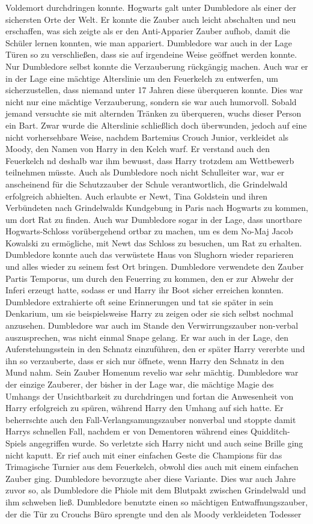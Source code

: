 \documentclass[a4paper, 10pt]{article}
\begin{document}
Voldemort durchdringen konnte. Hogwarts galt unter Dumbledore als einer der sichersten Orte der Welt. Er konnte die Zauber auch leicht abschalten und neu erschaffen, was sich zeigte als er den Anti-Apparier Zauber aufhob, damit die Schüler lernen konnten, wie man appariert. Dumbledore war auch in der Lage Türen so zu verschließen, dass sie auf irgendeine Weise geöffnet werden konnte. Nur Dumbledore selbst konnte die Verzauberung rückgängig machen. Auch war er in der Lage eine mächtige Alterslinie um den Feuerkelch zu entwerfen, um sicherzustellen, dass niemand unter 17 Jahren diese überqueren konnte. Dies war nicht nur eine mächtige Verzauberung, sondern sie war auch humorvoll. Sobald jemand versuchte sie mit alternden Tränken zu überqueren, wuchs dieser Person ein Bart. Zwar wurde die Alterslinie schließlich doch überwunden, jedoch auf eine nicht vorhersehbare Weise, nachdem Bartemius Crouch Junior, verkleidet als Moody, den Namen von Harry in den Kelch warf. Er verstand auch den Feuerkelch nd deshalb war ihm bewusst, dass Harry trotzdem am Wettbewerb teilnehmen müsste. Auch als Dumbledore noch nicht Schulleiter war, war er anscheinend für die Schutzzauber der Schule verantwortlich, die Grindelwald erfolgreich abhielten. Auch erlaubte er Newt, Tina Goldstein und ihren Verbündeten nach Grindelwalds Kundgebung in Paris nach Hogwarts zu kommen, um dort Rat zu finden. Auch war Dumbledore sogar in der Lage, dass unortbare Hogwarts-Schloss vorübergehend ortbar zu machen, um es dem No-Maj Jacob Kowalski zu ermögliche, mit Newt das Schloss zu besuchen, um Rat zu erhalten. Dumbledore konnte auch das verwüstete Haus von Slughorn wieder reparieren und alles wieder zu seinem fest Ort bringen. Dumbledore verwendete den Zauber Partis Temporus, um durch den Feuerring zu kommen, den er zur Abwehr der Inferi erzeugt hatte, sodass er und Harry ihr Boot sicher erreichen konnten. Dumbledore extrahierte oft seine Erinnerungen und tat sie später in sein Denkarium, um sie beispielsweise Harry zu zeigen oder sie sich selbst nochmal anzusehen. Dumbledore war auch im Stande den Verwirrungszauber non-verbal auszusprechen, was nicht einmal Snape gelang. Er war auch in der Lage, den Auferstehungsstein in den Schnatz einzuführen, den er später Harry vererbte und ihn so verzauberte, dass er sich nur öffnete, wenn Harry den Schnatz in den Mund nahm. Sein Zauber Homenum revelio war sehr mächtig. Dumbledore war der einzige Zauberer, der bisher in der Lage war, die mächtige Magie des Umhangs der Unsichtbarkeit zu durchdringen und fortan die Anwesenheit von Harry erfolgreich zu spüren, während Harry den Umhang auf sich hatte. Er beherrschte auch den Fall-Verlangsamungszauber nonverbal und stoppte damit Harrys schnellen Fall, nachdem er von Dementoren während eines Quidditch-Spiels angegriffen wurde. So verletzte sich Harry nicht und auch seine Brille ging nicht kaputt. Er rief auch mit einer einfachen Geste die Champions für das Trimagische Turnier aus dem Feuerkelch, obwohl dies auch mit einem einfachen Zauber ging. Dumbledore bevorzugte aber diese Variante. Dies war auch Jahre zuvor so, als Dumbledore die Phiole mit dem Blutpakt zwischen Grindelwald und ihm schweben ließ. Dumbledore benutzte einen so mächtigen Entwaffnungszauber, der die Tür zu Crouchs Büro sprengte und den als Moody verkleideten Todesser 
\end{document}
